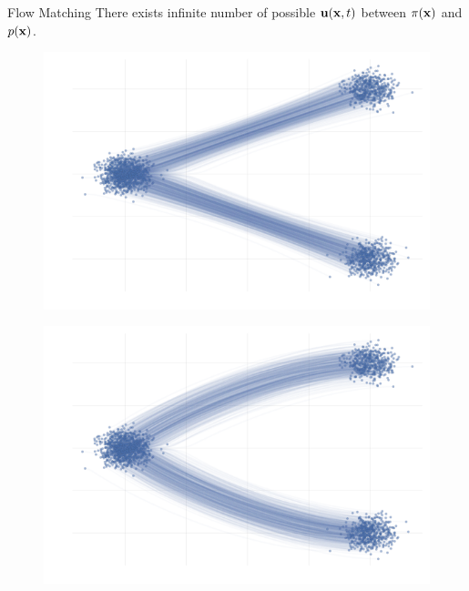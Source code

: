 \begin{frame}{Flow Matching}
	There exists infinite number of possible $\mathbf{u}(\mathbf{x}, t)$ between $\pi(\mathbf{x})$ and $p(\mathbf{x})$.
	\begin{minipage}[t]{0.45\columnwidth}
		\begin{figure}
			\centering
			\includegraphics[width=\linewidth]{figs/non_uniqueness1}
		\end{figure}
	\end{minipage}%
	\begin{minipage}[t]{0.53\columnwidth}
		\begin{figure}
			\centering
			\includegraphics[width=\linewidth]{figs/non_uniqueness2}
		\end{figure}
	\end{minipage}
\end{frame}
